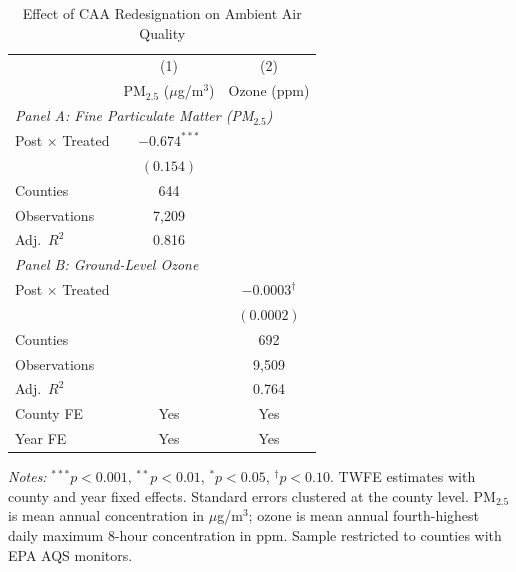\begin{table}[t]
\centering
\caption{Effect of CAA Redesignation on Ambient Air Quality}
\label{tab:pollution}
\begin{tabular}{lcc}
\toprule
 & (1) & (2) \\
 & PM$_{2.5}$ ($\mu$g/m$^3$) & Ozone (ppm) \\
\midrule
\multicolumn{3}{l}{\textit{Panel A: Fine Particulate Matter (PM$_{2.5}$)}} \\[0.3em]
Post $\times$ Treated & $-0.674^{***}$ & \\
 & $(0.154)$ & \\
Counties & 644 & \\
Observations & 7,209 & \\
Adj.\ $R^2$ & 0.816 & \\
\midrule
\multicolumn{3}{l}{\textit{Panel B: Ground-Level Ozone}} \\[0.3em]
Post $\times$ Treated & & $-0.0003^{\dagger}$ \\
 & & $(0.0002)$ \\
Counties & & 692 \\
Observations & & 9,509 \\
Adj.\ $R^2$ & & 0.764 \\
\midrule
County FE & Yes & Yes \\
Year FE & Yes & Yes \\
\bottomrule
\end{tabular}

\vspace{0.3em}
{\small \textit{Notes:} $^{***}p<0.001$, $^{**}p<0.01$, $^{*}p<0.05$, $^{\dagger}p<0.10$. TWFE estimates with county and year fixed effects. Standard errors clustered at the county level. PM$_{2.5}$ is mean annual concentration in $\mu$g/m$^3$; ozone is mean annual fourth-highest daily maximum 8-hour concentration in ppm. Sample restricted to counties with EPA AQS monitors.}
\end{table}
